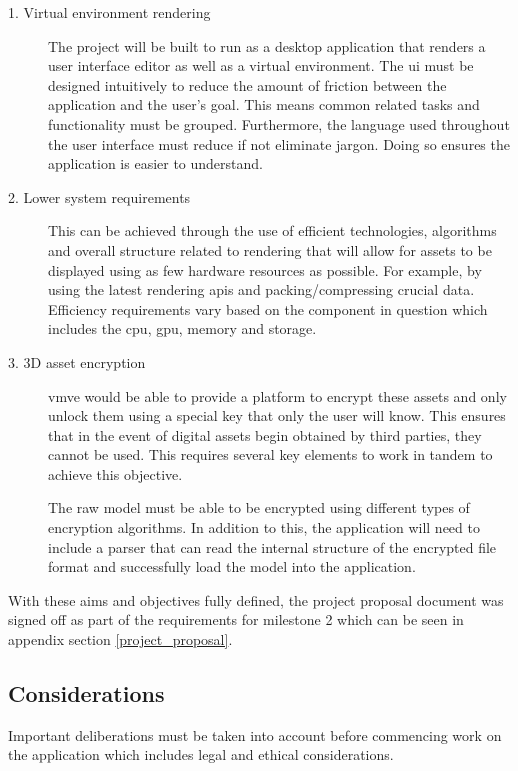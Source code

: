 \documentclass[11pt]{article}
\begin{document}
\begin{description}
  \item[1. Virtual environment rendering] 
    The project will be built to run as a desktop application that renders a
    user interface editor as well as a virtual environment. The \gls*{ui} must
    be designed intuitively to reduce the amount of friction between the
    application and the user's goal. This means common related tasks and
    functionality must be grouped. Furthermore, the language used throughout the
    user interface must reduce if not eliminate jargon. Doing so ensures the
    application is easier to understand.

  \item[2. Lower system requirements]
    This can be achieved through the use of efficient technologies, algorithms
    and overall structure related to rendering that will allow for assets to be
    displayed using as few hardware resources as possible. For example, by
    using the latest rendering \glspl*{api} and packing/compressing crucial
    data. Efficiency requirements vary based on the component in question which
    includes the \gls*{cpu}, \gls*{gpu}, memory and storage. 


  \item[3. 3D asset encryption]
    \gls*{vmve} would be able to provide a platform to encrypt these assets and
    only unlock them using a special key that only the user will know. This
    ensures that in the event of digital assets begin obtained by third parties,
    they cannot be used. This requires several key elements to work in tandem to
    achieve this objective.
    
    The raw model must be able to be encrypted using different types of
    encryption algorithms. In addition to this, the application will need to
    include a parser that can read the internal structure of the encrypted file
    format and successfully load the model into the application.
\end{description}

With these aims and objectives fully defined, the project proposal document was
signed off as part of the requirements for milestone 2 which can be seen in
appendix section \ref{project_proposal}.

\subsection{Considerations}
Important deliberations must be taken into account before commencing work on the
application which includes legal and ethical considerations.
\end{document}
